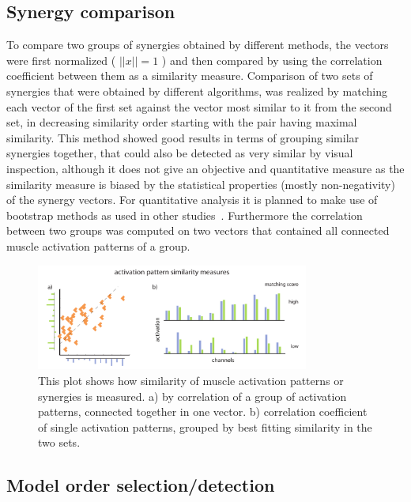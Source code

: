 \documentclass[a4paper]{article}
\newcommand{\abss}[1]{\ensuremath{\left|\left|#1\right|\right|}}
\begin{document}
\subsection{Synergy comparison} %
\label{sg:sub:comp}
To compare two groups of synergies obtained by different methods, the vectors were
first normalized ( $\abss{x} = 1$ ) and then compared by using the correlation coefficient between them as a similarity measure. Comparison of two sets of synergies that were obtained by different algorithms, was realized by matching each vector of the first set against the vector most similar to it from the second set, in decreasing similarity order starting with the pair having maximal similarity. This method showed good results in terms of grouping similar synergies together, that could also be detected as very similar by visual inspection, although it does not give an objective and quantitative measure as the similarity measure is biased by the statistical properties (mostly non-negativity) of the synergy vectors. For quantitative analysis it is planned to make use of bootstrap methods as used in other studies~\cite{AdAvella:2005p2330}. Furthermore the correlation between two groups was computed on two vectors that contained all connected muscle activation patterns of a group.
\begin{figure}[ht]
	\centering
		\includegraphics[width=0.8\textwidth]{images/match_explanation.pdf}
	\caption{This plot shows how similarity of muscle activation patterns or synergies is measured. a) by correlation of a group of activation patterns, connected together in one vector. b) correlation coefficient of single activation patterns, grouped by best fitting similarity in the two sets. }
	\label{sg:fig:images_match_explanation}
\end{figure}


\subsection{Model order selection/detection} %
\label{sg:sub:model_order}
\end{document}
